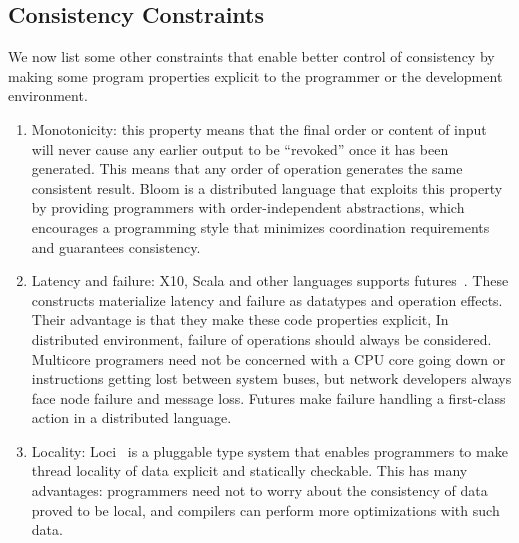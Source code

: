 \documentclass[]{usiinfprospectus}
\begin{document}
\subsection{Consistency Constraints}
We now list some other constraints that enable better control of consistency by making some program properties explicit to the programmer or the development environment. 
\begin{enumerate}
\item Monotonicity: this property means that the final order or content of input will never cause any earlier output to be ``revoked'' once it has been generated. This means that any order of operation generates the same consistent result. Bloom is a distributed language that exploits this property by providing programmers with order-independent abstractions, which encourages a programming style that minimizes coordination requirements and guarantees consistency.~\cite{alvaro2011consistency}

\item Latency and failure: X10, Scala and other languages supports futures~\cite{hallerfutures}. These constructs materialize latency and failure as datatypes and operation effects. Their advantage is that they make these code properties explicit, In distributed environment, failure of operations should always be considered. Multicore programers need not be concerned with a CPU core going down or instructions getting lost between system buses, but network developers always face node failure and message loss. Futures make failure handling a first-class action in a distributed language.

\item Locality: Loci~\cite{wrigstad2009loci} is a pluggable type system that enables programmers to make thread locality of data explicit and statically checkable. This has many advantages: programmers need not to worry about the consistency of data proved to be local, and compilers can perform more optimizations with such data. 


\end{enumerate}
\end{document}
